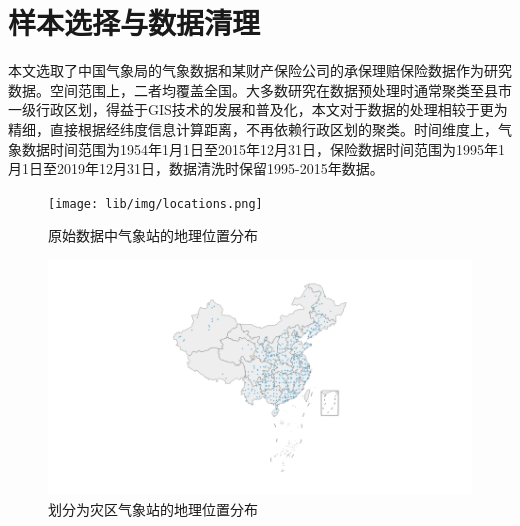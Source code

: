 \section{样本选择与数据清理}\label{sec:data}

本文选取了中国气象局的气象数据和某财产保险公司的承保理赔保险数据作为研究数据。空间范围上，二者均覆盖全国。大多数研究在数据预处理时通常聚类至县市一级行政区划\citep{0Do,杨娜娜2019自然灾害与企业现金持有}，得益于GIS技术的发展和普及化，本文对于数据的处理相较于更为精细，直接根据经纬度信息计算距离，不再依赖行政区划的聚类。时间维度上，气象数据时间范围为1954年1月1日至2015年12月31日，保险数据时间范围为1995年1月1日至2019年12月31日，数据清洗时保留1995-2015年数据。

\begin{figure}[H]
    \centering
    \begin{minipage}{0.48\linewidth}
        \texttt{[image: lib/img/locations.png]}
        \caption{原始数据中气象站的地理位置分布}
        \label{fig:location}
    \end{minipage}
    \begin{minipage}{0.48\linewidth}
        \includegraphics[width=\textwidth, trim=200 0 200 0]{lib/img/near.png}
        \caption{划分为灾区气象站的地理位置分布}
    \end{minipage}
\end{figure}
